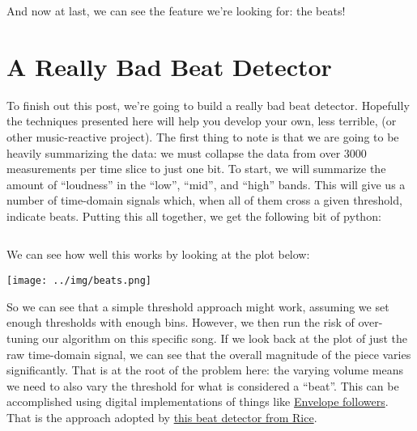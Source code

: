 \documentclass[12pt]{article}
\begin{document}
And now at last, we can see the feature we're looking for: the beats!

\section{A Really Bad Beat Detector}
To finish out this post,
we're going to build a really bad beat detector.
Hopefully the techniques presented here will help you develop your own,
less terrible,
(or other music-reactive project).
The first thing to note is that we are going to be heavily summarizing the data:
we must collapse the data from over 3000 measurements per time slice to just one bit.
To start,
we will summarize the amount of ``loudness'' in the ``low'', ``mid'', and ``high''
bands.
This will give us a number of time-domain signals
which, when all of them cross a given threshold,
indicate beats.
Putting this all together, we get the following bit of python:

\inputminted[firstline=17,lastline=46]{python}{"../beat_detector.py"}

We can see how well this works by looking at the plot below:

\texttt{[image: ../img/beats.png]}

So we can see that a simple threshold approach might work,
assuming we set enough thresholds with enough bins.
However, we then run the risk of over-tuning our algorithm
on this specific song.
If we look back at the plot of just the raw time-domain signal,
we can see that the overall magnitude of the piece varies significantly.
That is at the root of the problem here:
the varying volume means we need to also vary the threshold for what is
considered a ``beat''.
This can be accomplished using digital implementations of things like
\href{https://en.wikipedia.org/wiki/Envelope_detector}{Envelope followers}.
That is the approach adopted by
\href{https://www.clear.rice.edu/elec301/Projects01/beat_sync/beatalgo.html}{this beat detector from Rice}.
\end{document}
